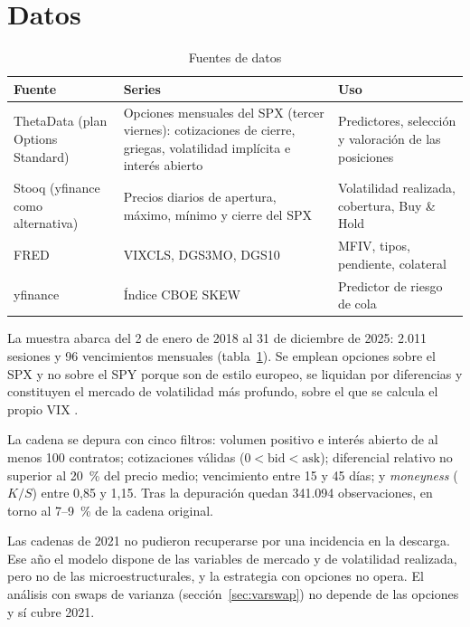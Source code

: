 \documentclass[11pt,a4paper]{article}
\begin{document}
\section{Datos}\label{sec:datos}

\begin{table}[!htbp]
\centering
\caption{Fuentes de datos}\label{tab:datos}
\small
\begin{tabularx}{\linewidth}{@{}>{\raggedright\arraybackslash}p{3.3cm}X>{\raggedright\arraybackslash}p{4.4cm}@{}}
\toprule
Fuente & Series & Uso \\
\midrule
ThetaData (plan Options Standard) & Opciones mensuales del SPX (tercer viernes): cotizaciones de cierre, griegas, volatilidad implícita e interés abierto & Predictores, selección y valoración de las posiciones \\
Stooq (yfinance como alternativa) & Precios diarios de apertura, máximo, mínimo y cierre del SPX & Volatilidad realizada, cobertura, Buy \& Hold \\
FRED & VIXCLS, DGS3MO, DGS10 & MFIV, tipos, pendiente, colateral \\
yfinance & Índice CBOE SKEW & Predictor de riesgo de cola \\
\bottomrule
\end{tabularx}
\end{table}

La muestra abarca del 2 de enero de 2018 al 31 de diciembre de 2025: 2.011 sesiones y 96 vencimientos mensuales (tabla~\ref{tab:datos}). Se emplean opciones sobre el SPX y no sobre el SPY porque son de estilo europeo, se liquidan por diferencias y constituyen el mercado de volatilidad más profundo, sobre el que se calcula el propio VIX \citep{cboe2019}.

La cadena se depura con cinco filtros: volumen positivo e interés abierto de al menos 100 contratos; cotizaciones válidas ($0<\text{bid}<\text{ask}$); diferencial relativo no superior al 20~\% del precio medio; vencimiento entre 15 y 45 días; y \textit{moneyness} ($K/S$) entre 0,85 y 1,15. Tras la depuración quedan 341.094 observaciones, en torno al 7--9~\% de la cadena original.

Las cadenas de 2021 no pudieron recuperarse por una incidencia en la descarga. Ese año el modelo dispone de las variables de mercado y de volatilidad realizada, pero no de las microestructurales, y la estrategia con opciones no opera. El análisis con swaps de varianza (sección~\ref{sec:varswap}) no depende de las opciones y sí cubre 2021.
\end{document}
